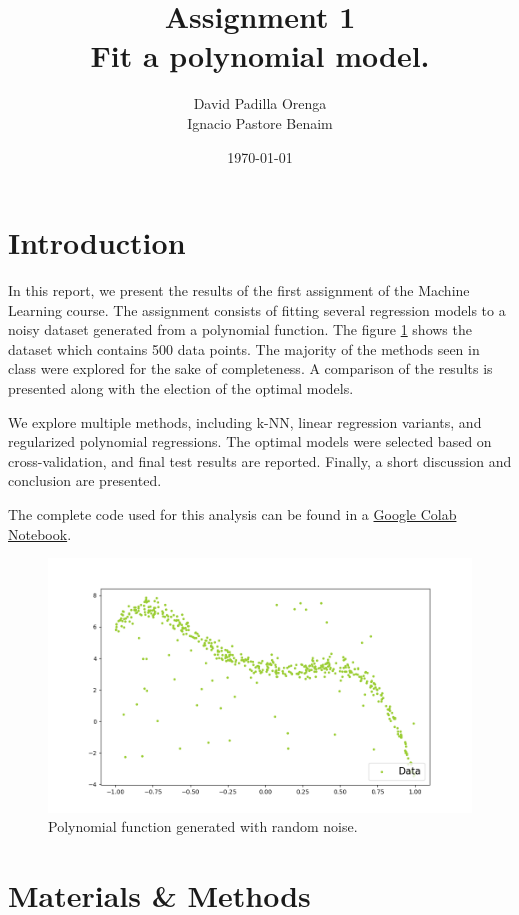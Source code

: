 \documentclass[twocolumn]{article}
\title{Assignment 1 \\ \small Fit a polynomial model.}
\author{David Padilla Orenga\\ Ignacio Pastore Benaim}
\date{\today}   %
\begin{document}
\maketitle

\section{Introduction}

In this report, we present the results of the first assignment of the Machine Learning course. The assignment consists of fitting 
several regression models to a noisy dataset generated from a polynomial function. The figure \ref{fig:polynomial_data} shows 
the dataset which contains 500 data points. The majority of the methods seen in class were explored for the sake 
of completeness. A comparison of the results is presented along with the election of the optimal models. 

We explore multiple methods, including k-NN, linear regression variants, and regularized 
polynomial regressions. The optimal models were selected based on cross-validation, 
and final test results are reported. Finally, a short discussion and conclusion are presented.

The complete code used for this analysis can be found in a \href{https://colab.research.google.com/drive/1Gg35b8epwsI3nkCeiqCgBeFCd3aNdahI?usp=sharing}{Google Colab Notebook}.

\begin{figure}[!htb]
\centering
\includegraphics[width=0.95\columnwidth]{images/scatter_plot.png}
\caption{Polynomial function generated with random noise.}
\label{fig:polynomial_data}
\end{figure}
  
\section{Materials \& Methods}
\end{document}

